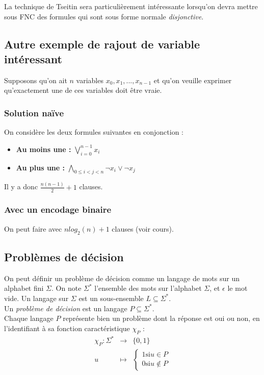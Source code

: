 \documentclass[a4paper]{article}
\begin{document}
  La technique de Tseitin sera particulièrement intéressante lorsqu'on devra mettre
  sous FNC des formules qui sont sous forme normale \textit{disjonctive}.

  \subsection{Autre exemple de rajout de variable intéressant}
  Supposons qu'on ait $n$ variables $x_0, x_1, ..., x_{n-1}$ et qu'on veuille
  exprimer qu'exactement une de ces variables doit être vraie. 

    \subsubsection{Solution naïve}
    On considère les deux formules suivantes en conjonction :
    \begin{itemize}
      \item \textbf{Au moins une :} $\bigvee^{n-1}_{i=0} x_i$
      \item \textbf{Au plus une :} $\bigwedge_{0 \leq i < j < n} \lnot x_i \lor \lnot x_j $
    \end{itemize}
    Il y a donc $\frac{n(n-1)}{2} + 1$ clauses.

    \subsubsection{Avec un encodage binaire}
    On peut faire avec $n log_2(n) + 1$ clauses (voir cours).

  \subsection{Problèmes de décision}
  On peut définir un problème de décision comme un langage de mots sur un alphabet
  fini $\Sigma$. On note $\Sigma^*$ l'ensemble des mots sur l'alphabet $\Sigma$, et
  $\epsilon$ le mot vide. Un langage sur $\Sigma$ est un sous-ensemble $L \subseteq \Sigma^*$. \\

  Un \textit{problème de décision} est un langage $P \subseteq \Sigma^*$.\\

  Chaque langage $P$ représente bien un problème dont la réponse est oui ou non, 
  en l'identifiant à sa fonction caractéristique $\chi_P$ :
  \begin{align*}
    \chi_P : \Sigma^* & \rightarrow & \{0,1\} \\
    u & \mapsto & \begin{cases}1 \text{si} u \in P \\ 0 \text{si} u \not \in P\end{cases}
  \end{align*}
\end{document}
